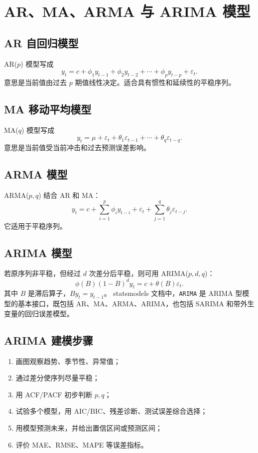 \documentclass[11pt,a4paper]{ctexart}
\begin{document}
\section{AR、MA、ARMA 与 ARIMA 模型}
\subsection{AR 自回归模型}
AR($p$) 模型写成
\[
y_t=c+\phi_1y_{t-1}+\phi_2y_{t-2}+\cdots+\phi_p y_{t-p}+\varepsilon_t.
\]
意思是当前值由过去 $p$ 期值线性决定。适合具有惯性和延续性的平稳序列。

\subsection{MA 移动平均模型}
MA($q$) 模型写成
\[
y_t=\mu+\varepsilon_t+\theta_1\varepsilon_{t-1}+\cdots+\theta_q\varepsilon_{t-q}.
\]
意思是当前值受当前冲击和过去预测误差影响。

\subsection{ARMA 模型}
ARMA($p,q$) 结合 AR 和 MA：
\[
y_t=c+\sum_{i=1}^p\phi_i y_{t-i}+\varepsilon_t+\sum_{j=1}^q\theta_j\varepsilon_{t-j}.
\]
它适用于平稳序列。

\subsection{ARIMA 模型}
若原序列非平稳，但经过 $d$ 次差分后平稳，则可用 ARIMA($p,d,q$)：
\[
\phi(B)(1-B)^d y_t=c+\theta(B)\varepsilon_t.
\]
其中 $B$ 是滞后算子，$By_t=y_{t-1}$。
statsmodels 文档中，\texttt{ARIMA} 是 ARIMA 型模型的基本接口，既包括 AR、MA、ARMA、ARIMA，也包括 SARIMA 和带外生变量的回归误差模型。

\subsection{ARIMA 建模步骤}
\begin{enumerate}
  \item 画图观察趋势、季节性、异常值；
  \item 通过差分使序列尽量平稳；
  \item 用 ACF/PACF 初步判断 $p,q$；
  \item 试验多个模型，用 AIC/BIC、残差诊断、测试误差综合选择；
  \item 用模型预测未来，并给出置信区间或预测区间；
  \item 评价 MAE、RMSE、MAPE 等误差指标。
\end{enumerate}
\end{document}
